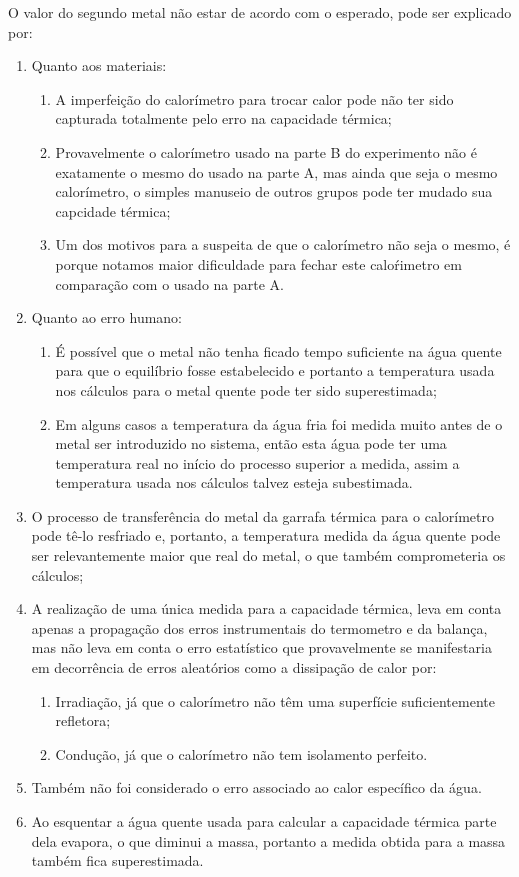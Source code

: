 \documentclass[a4paper]{article}
\begin{document}
		O valor do segundo metal não estar de acordo com o esperado, pode
		ser explicado por: 
		\begin{enumerate}
			\item Quanto aos materiais: 
			\begin{enumerate}
				\item A imperfeição do calorímetro para trocar calor pode não ter sido capturada
				totalmente pelo erro na capacidade térmica; 
				\item Provavelmente o calorímetro usado na parte B do experimento não é
				exatamente o mesmo do usado na parte A, mas ainda que seja o mesmo
				calorímetro, o simples manuseio de outros grupos pode ter mudado sua
				capcidade térmica; 
				\item Um dos motivos para a suspeita de que o calorímetro não seja o mesmo,
				é porque notamos maior dificuldade para fechar este calo\'{r}imetro
				em comparação com o usado na parte A. 
			\end{enumerate}
			\item Quanto ao erro humano: 
			\begin{enumerate}
				\item É possível que o metal não tenha ficado tempo suficiente na água quente
				para que o equilíbrio fosse estabelecido e portanto a temperatura
				usada nos cálculos para o metal quente pode ter sido superestimada; 
				\item Em alguns casos a temperatura da água fria foi medida muito antes
				de o metal ser introduzido no sistema, então esta água pode ter uma
				temperatura real no início do processo superior a medida, assim a
				temperatura usada nos cálculos talvez esteja subestimada. 
			\end{enumerate}
			\item O processo de transferência do metal da garrafa térmica para o calorímetro
			pode tê-lo resfriado e, portanto, a temperatura medida da água quente
			pode ser relevantemente maior que real do metal, o que também comprometeria
			os cálculos; 
			\item A realização de uma única medida para a capacidade térmica, leva em
			conta apenas a propagação dos erros instrumentais do termometro e
			da balança, mas não leva em conta o erro estatístico que provavelmente
			se manifestaria em decorrência de erros aleatórios como a dissipação
			de calor por: 
			\begin{enumerate}
				\item Irradiação, já que o calorímetro não têm uma superfície suficientemente
				refletora; 
				\item Condução, já que o calorímetro não tem isolamento perfeito. 
			\end{enumerate}
			\item Também não foi considerado o erro associado ao calor específico da
			água. 
			\item Ao esquentar a água quente usada para calcular a capacidade térmica
			parte dela evapora, o que diminui a massa, portanto a medida obtida
			para a massa também fica superestimada. 
		\end{enumerate}
\end{document}
